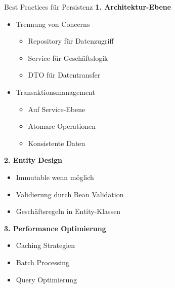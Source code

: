 \begin{KR}{Best Practices für Persistenz}
\textbf{1. Architektur-Ebene}
\begin{itemize}
    \item Trennung von Concerns
    \begin{itemize}
        \item Repository für Datenzugriff
        \item Service für Geschäftslogik
        \item DTO für Datentransfer
    \end{itemize}
    \item Transaktionsmanagement
    \begin{itemize}
        \item Auf Service-Ebene
        \item Atomare Operationen
        \item Konsistente Daten
    \end{itemize}
\end{itemize}

\textbf{2. Entity Design}
\begin{itemize}
    \item Immutable wenn möglich
    \item Validierung durch Bean Validation
    \item Geschäftsregeln in Entity-Klassen
\end{itemize}

\textbf{3. Performance Optimierung}
\begin{itemize}
    \item Caching Strategien
    \item Batch Processing
    \item Query Optimierung
\end{itemize}
\end{KR}

